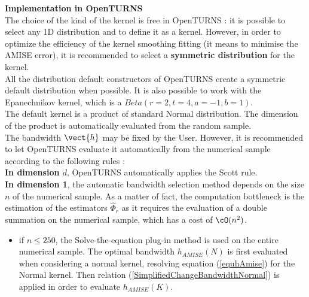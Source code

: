 {  \vspace*{0.5cm}

  \textbf{Implementation in OpenTURNS}\\
  The choice of the kind of the kernel is free in OpenTURNS : it is possible to select any 1D distribution and to define it as a kernel. However, in order to optimize the efficiency of the kernel smoothing fitting (it means to minimise the AMISE error), it is recommended to select a {\bf symmetric distribution} for the kernel. \\
  All the distribution default constructors of OpenTURNS create a symmetric default distribution when possible. It is also possible to work with the Epanechnikov kernel, which is a $Beta(r=2, t=4, a=-1, b=1)$. \\
  The default kernel is a product of standard Normal distribution. The dimension of the product is automatically evaluated from the random sample.\\

  The bandwidth $\vect{h}$ may be fixed by the User. However, it is recommended to let OpenTURNS evaluate it automatically from the numerical sample according to the following rules :\\

  {\bf In dimension $d$}, OpenTURNS automatically applies the Scott rule.\\




  {\bf In dimension 1}, the automatic bandwidth selection method depends  on the size $n$ of the numerical sample. As a matter of fact, the computation bottleneck is the estimation of the estimators $\hat{\Phi}_r$ as it requires the evaluation of a double summation on the numerical sample, which has a cost of $\cO(n^2)$.
  \begin{itemize}
  \item if $n \leq 250$, the Solve-the-equation  plug-in method is used on the entire numerical sample. The optimal bandwidth $h_{AMISE}(N)$  is first evaluated when considering a normal kernel, resolving equation (\ref{equhAmise}) for the Normal kernel. Then relation (\ref{SimplifiedChangeBandwidthNormal}) is applied in order to evaluate $h_{AMISE}(K)$.


\end{itemize}}

